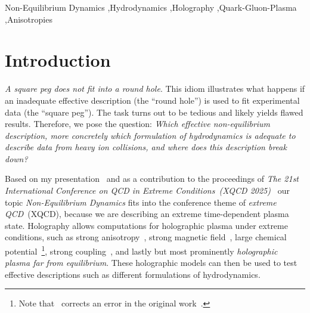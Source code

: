 \documentclass[preprint,12pt]{elsarticle}
\begin{document}
\begin{frontmatter}
\begin{keyword}
Non-Equilibrium Dynamics \sep Hydrodynamics \sep Holography \sep Quark-Gluon-Plasma \sep Anisotropies



\end{keyword}

\end{frontmatter}



\section{Introduction}
\label{sec:intro}
%
%
\emph{A square peg does not fit into a round hole}. This idiom illustrates what happens if an inadequate effective description (the ``round hole'') is used to fit experimental data (the ``square peg''). The task turns out to be tedious and likely yields flawed results. Therefore, we pose the question: \emph{Which effective non-equilibrium description, more concretely which formulation of hydrodynamics is adequate to describe data from heavy ion collisions, and where does this description break down?} 

Based on my presentation~\cite{KaminskiXQCD2025} and as a contribution to the proceedings of \emph{The 21st International Conference on QCD in Extreme Conditions~(XQCD 2025)}~\cite{XQCD2025} our topic \emph{Non-Equilibrium Dynamics} fits into the conference theme of \emph{extreme QCD}~(XQCD), because we are describing an extreme time-dependent plasma state. Holography allows computations for holographic plasma under extreme conditions, such as strong anisotropy~\cite{Chesler:2008hg,Chesler:2010bi}, strong magnetic field~\cite{Ammon:2020rvg}, large chemical potential~\cite{Erdmenger:2007ja,Kaminski:2008ai}\footnote{Note that~\cite{Kaminski:2008ai} corrects an error in the original work~\cite{Erdmenger:2007ap}.}, strong coupling~\cite{Maldacena:1997re}, and lastly but most prominently \emph{holographic plasma far from equilibrium}. These holographic models can then be used to test effective descriptions such as different formulations of hydrodynamics. 
\end{document}

